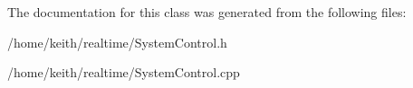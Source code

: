 The documentation for this class was generated from the following files\-:\begin{DoxyCompactItemize}
\item 
/home/keith/realtime/System\-Control.\-h\item 
/home/keith/realtime/System\-Control.\-cpp\end{DoxyCompactItemize}
